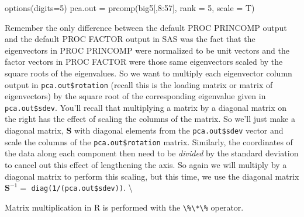 \documentclass[
]{article}
\newenvironment{Shaded}{\begin{snugshade}}{\end{snugshade}}
\newcommand{\AttributeTok}[1]{\textcolor[rgb]{0.77,0.63,0.00}{#1}}
\newcommand{\CommentTok}[1]{\textcolor[rgb]{0.56,0.35,0.01}{\textit{#1}}}
\newcommand{\DecValTok}[1]{\textcolor[rgb]{0.00,0.00,0.81}{#1}}
\newcommand{\FunctionTok}[1]{\textcolor[rgb]{0.00,0.00,0.00}{#1}}
\newcommand{\NormalTok}[1]{#1}
\newcommand{\OtherTok}[1]{\textcolor[rgb]{0.56,0.35,0.01}{#1}}
\newcommand{\SpecialCharTok}[1]{\textcolor[rgb]{0.00,0.00,0.00}{#1}}
\theoremstyle{definition}
\theoremstyle{definition}
\theoremstyle{definition}
\theoremstyle{definition}
\theoremstyle{remark}
\begin{document}
\begin{Shaded}
\begin{Highlighting}[]
\FunctionTok{options}\NormalTok{(}\AttributeTok{digits=}\DecValTok{5}\NormalTok{)}
\NormalTok{pca.out }\OtherTok{=} \FunctionTok{prcomp}\NormalTok{(big5[,}\DecValTok{8}\SpecialCharTok{:}\DecValTok{57}\NormalTok{], }\AttributeTok{rank =} \DecValTok{5}\NormalTok{, }\AttributeTok{scale =}\NormalTok{ T)}
\end{Highlighting}
\end{Shaded}

Remember the only difference between the default PROC PRINCOMP output and the default PROC FACTOR output in SAS was the fact that the eigenvectors in PROC PRINCOMP were normalized to be unit vectors and the factor vectors in PROC FACTOR were those same eigenvectors scaled by the square roots of the eigenvalues. So we want to multiply each eigenvector column output in \texttt{pca.out\$rotation} (recall this is the loading matrix or matrix of eigenvectors) by the square root of the corresponding eigenvalue given in \texttt{pca.out\$sdev}. You'll recall that multiplying a matrix by a diagonal matrix on the right has the effect of scaling the columns of the matrix. So we'll just make a diagonal matrix, \(\textbf{S}\) with diagonal elements from the \texttt{pca.out\$sdev} vector and scale the columns of the \texttt{pca.out\$rotation} matrix. Similarly, the coordinates of the data along each component then need to be \emph{divided} by the standard deviation to cancel out this effect of lengthening the axis. So again we will multiply by a diagonal matrix to perform this scaling, but this time, we use the diagonal matrix \(\textbf{S}^{-1}=\) \texttt{diag(1/(pca.out\$sdev))}. \textbackslash{}

Matrix multiplication in R is performed with the \texttt{\textbackslash{}\%\textbackslash{}*\textbackslash{}\%} operator.

\begin{Shaded}
\end{Shaded}
\end{document}
